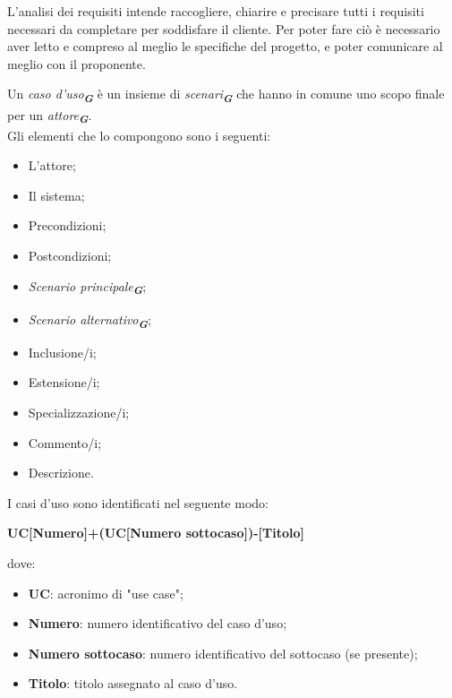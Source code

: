 L’analisi dei requisiti intende raccogliere, chiarire e precisare tutti i requisiti necessari da completare per soddisfare il cliente. Per poter fare ciò è necessario aver letto e compreso al meglio le specifiche del progetto, e poter comunicare al meglio con il proponente.

Un \emph{caso d'uso}\textsubscript{\textit{\textbf{G}}} è un insieme di \emph{scenari}\textsubscript{\textit{\textbf{G}}} che hanno in comune uno scopo finale per un \emph{attore}\textsubscript{\textit{\textbf{G}}}.\\
Gli elementi che lo compongono sono i seguenti:
\begin{itemize}
    \item L'attore;
    \item Il sistema;
    \item Precondizioni;
    \item Postcondizioni;
    \item \emph{Scenario principale}\textsubscript{\textit{\textbf{G}}};
    \item \emph{Scenario alternativo}\textsubscript{\textit{\textbf{G}}};
    \item Inclusione/i;
    \item Estensione/i;
    \item Specializzazione/i;
    \item Commento/i;
    \item Descrizione.  
\end{itemize}
I casi d’uso sono identificati nel seguente modo:\\
\begin{center}
    \textbf{UC[Numero]+(UC[Numero sottocaso])-[Titolo]}
\end{center}
dove:
\begin{itemize}
    \item \textbf{UC}: acronimo di "use case";
    \item \textbf{Numero}: numero identificativo del caso d’uso;
    \item \textbf{Numero sottocaso}: numero identificativo del sottocaso (se presente);
    \item \textbf{Titolo}: titolo assegnato al caso d’uso.
\end{itemize}

